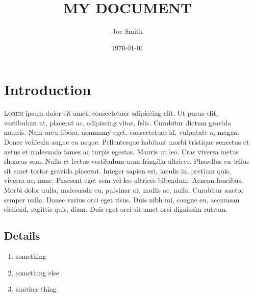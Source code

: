 \documentclass[12pt,letterpaper]{article}
\title{MY DOCUMENT}
\author{Joe Smith}
\date{\today}
\begin{document}
\maketitle

\section{Introduction}

\lettrine[lines=3]{L}{orem} ipsum dolor sit amet, consectetuer adipiscing elit. Ut purus elit, vestibulum ut, placerat ac, adipiscing vitae, felis. Curabitur dictum gravida mauris. Nam arcu libero, nonummy eget, consectetuer id, vulputate a, magna. Donec vehicula augue eu neque. Pellentesque habitant morbi tristique senectus et netus et malesuada fames ac turpis egestas. Mauris ut leo. Cras viverra metus rhoncus sem. Nulla et lectus vestibulum urna fringilla ultrices. Phasellus eu tellus sit amet tortor gravida placerat. Integer sapien est, iaculis in, pretium quis, viverra ac, nunc. Praesent eget sem vel leo ultrices bibendum. Aenean faucibus. Morbi dolor nulla, malesuada eu, pulvinar at, mollis ac, nulla. Curabitur auctor semper nulla. Donec varius orci eget risus. Duis nibh mi, congue eu, accumsan eleifend, sagittis quis, diam. Duis eget orci sit amet orci dignissim rutrum.

\lipsum[2-4]

\subsection{Details}

\lipsum[1-2]

\begin{enumerate}
\item something
\item something else
\item another thing
\end{enumerate}

\lipsum[1-5]
\end{document}
